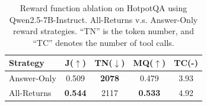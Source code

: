 \begin{table}[t]
\centering
\small
\caption{Reward function ablation on HotpotQA using Qwen2.5-7B-Instruct. All-Returns v.s. Answer-Only reward strategies. ``TN'' is the token number, and ``TC'' denotes the number of tool calls.}
\label{tab:reward_ablation}
\begin{tabular}{@{}lcccc@{}}
\toprule
\textbf{Strategy} & \textbf{J}($\uparrow$) & \textbf{TN}($\downarrow$) & \textbf{MQ}($\uparrow$) & \textbf{TC}(-) \\
\midrule
Answer-Only & 0.509 & \textbf{2078} & 0.479 & 3.93 \\
All-Returns & \textbf{0.544} & 2117 & \textbf{0.533} & 4.92 \\
\bottomrule
\end{tabular}
\vspace{-0.2cm}
\end{table}

